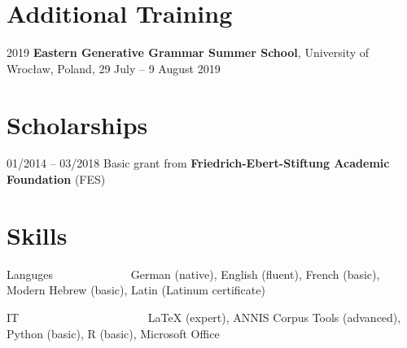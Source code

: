 \documentclass[11pt]{article}
\begin{document}
\section*{Additional Training}
\begin{list}{}{
		\setlength{\leftmargin}{3.5cm}
		\setlength{\itemindent}{-2.5cm}
	}
	
	\item[2019\phantom{~--~03/2022/04~}] \textbf{Eastern Generative Grammar Summer School}, University of Wrocław, Poland, 29 July -- 9 August 2019
\end{list}


\section*{Scholarships}

\begin{list}{}{
	\setlength{\leftmargin}{3.5cm}
	\setlength{\itemindent}{-2.5cm}
	}

	\item[01/2014 -- 03/2018] Basic grant from \textbf{Friedrich-Ebert-Stiftung Academic Foundation} (FES)

\end{list}


\section*{Skills}

\begin{list}{}{
		\setlength{\leftmargin}{3.5cm}
		\setlength{\itemindent}{-2.5cm}
	}
	
	\item[Languges~~~~~~~~~~~~~] German (native), English (fluent), French (basic), Modern Hebrew (basic), Latin (Latinum certificate)
	\item[IT~~~~~~~~~~~~~~~~~~~~~~] LaTeX (expert), ANNIS Corpus Tools (advanced), Python (basic), R (basic), Microsoft Office
	
\end{list}

\vspace{2\baselineskip}
\end{document}

